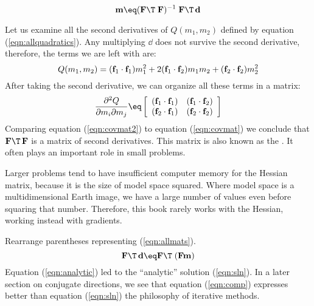 \par
\begin{equation}
\bold m \eq
( \bold F\T \; \bold F )^{-1} \;
\bold F\T\,\dd 
\label{eqn:sln}
\end{equation}

\par
Let us examine all the second derivatives of $Q(m_1,m_2)$ defined by equation (\ref{eqn:allquadratics}).
Any multiplying $\dd$ does not survive the second derivative, therefore, the terms we are left with are:
\begin{equation}
Q(m_1,m_2) = ({\bf f}_1\cdot{\bf f}_1) m_1^2 +
           2 ({\bf f}_1\cdot{\bf f}_2) m_1 m_2 +
             ({\bf f}_2\cdot{\bf f}_2) m_2^2
\end{equation}
After taking the second derivative, we can organize all these terms in a matrix:
\begin{equation}
\label{eqn:covmat2}
\frac{\partial^2 Q}{\partial m_i\partial m_j} \eq
        \left[
                \begin{array}{cc}
                        (\ff_1\cdot  \ff_1) &  (\ff_1 \cdot \ff_2)   \\
                        (\ff_2\cdot  \ff_1) &  (\ff_2 \cdot \ff_2)  
                \end{array}
        \right]
\end{equation}
Comparing equation (\ref{eqn:covmat2}) to equation (\ref{eqn:covmat}) we conclude
that $\bold F\T\,\bold F$ is a matrix of second derivatives.
This matrix is also known as the
.
It often plays an important role in small problems.

\par
Larger problems tend to have insufficient computer memory for the Hessian matrix,
because it is the size of model space squared.
Where model space is a multidimensional Earth image,
we have a large number of values even before squaring that number.
Therefore, this book rarely works with the Hessian,
working instead with gradients.
\par
Rearrange parentheses representing (\ref{eqn:allmats}).
\begin{equation}
\bold F\T\,\dd \eq  \bold F\T \; (\bold F   \bold m )
\label{eqn:comp}
\end{equation}
Equation
(\ref{eqn:analytic})
led to the ``analytic'' solution (\ref{eqn:sln}).
In a later section on conjugate directions,
we see that equation
(\ref{eqn:comp})
expresses better than
equation
(\ref{eqn:sln})
the philosophy of iterative methods.

